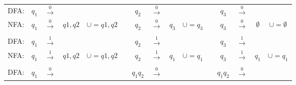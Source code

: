 \documentclass[
	final,
	a4paper,
	oneside,
	parskip=full,
	headings=standardclasses,
	headings=big,
	pointednumbers
]{scrartcl}
\begin{document}
    \begin{tabular}{l|ccc|cl|ccc|cl|ccc|c}
            \multicolumn{1}{c}{DFA:} & $q_1$    & $\xrightarrow{0}$ & \multicolumn{1}{c}{} & & 
            \multicolumn{1}{c}{}     & $q_2$    & $\xrightarrow{0}$ & \multicolumn{1}{c}{} & & 
            \multicolumn{1}{c}{}     & $q_3$    & $\xrightarrow{0}$ & \multicolumn{1}{c}{} &
        \\  
            \cline{2-4} \cline{7-9} \cline{12-14}
            NFA:                     & $q_1$   & $\xrightarrow{0}$  & $q1,q2$     & $\cup = q1,q2 $      &
                                     & $q_2$   & $\xrightarrow{0}$  & $q_3$       & $\cup = q_3$         &
                                     & $q_3$   & $\xrightarrow{0}$  & $\emptyset$ & $\cup = \emptyset$
        \\
            \cline{2-4} \cline{7-9} \cline{12-14}
            \multicolumn{1}{c}{} & & & \multicolumn{1}{c}{} & &
            \multicolumn{1}{c}{} & & & \multicolumn{1}{c}{} & &
            \multicolumn{1}{c}{} & & & \multicolumn{1}{c}{} &
        \\
            \multicolumn{1}{c}{DFA:} & $q_1$    & $\xrightarrow{1}$ & \multicolumn{1}{c}{} & & 
            \multicolumn{1}{c}{}     & $q_2$    & $\xrightarrow{1}$ & \multicolumn{1}{c}{} & & 
            \multicolumn{1}{c}{}     & $q_3$    & $\xrightarrow{1}$ & \multicolumn{1}{c}{} &
        \\  
            \cline{2-4} \cline{7-9} \cline{12-14}
            NFA:                     & $q_1$    & $\xrightarrow{1}$ & $q1,q2$  & $\cup = q1,q2$  &
                                     & $q_2$    & $\xrightarrow{1}$ & $q_1$    & $\cup = q_1$    &
                                     & $q_3$    & $\xrightarrow{1}$ & $q_1$    & $\cup = q_1$
        \\
            \cline{2-4} \cline{7-9} \cline{12-14}
            \multicolumn{1}{c}{} & & & \multicolumn{1}{c}{} & &
            \multicolumn{1}{c}{} & & & \multicolumn{1}{c}{} & &
            \multicolumn{1}{c}{} & & & \multicolumn{1}{c}{} &
        \\
            \multicolumn{1}{c}{DFA:} & $q_1$    & $\xrightarrow{0}$ & \multicolumn{1}{c}{} & & 
            \multicolumn{1}{c}{}     & $q_1q_2$ & $\xrightarrow{0}$ & \multicolumn{1}{c}{} & & 
            \multicolumn{1}{c}{}     & $q_1q_2$ & $\xrightarrow{0}$ & \multicolumn{1}{c}{} &
        \\  
            \cline{2-4} \cline{7-9} \cline{12-14}

\end{tabular}
\end{document}

